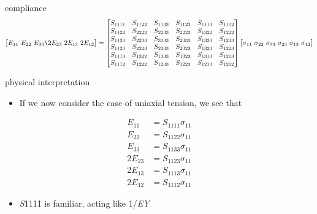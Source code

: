 \documentclass[
  letterpaper,
  ignorenonframetext,
  aspectratio=43,
  handout,
  12pt]{beamer}
\providecommand{\tightlist}{%
  \setlength{\itemsep}{0pt}\setlength{\parskip}{0pt}}
\providecommand{\tightlist}{%
\setlength{\itemsep}{0pt}\setlength{\parskip}{0pt}}
\begin{document}
\begin{frame}{compliance}
\protect\hypertarget{compliance}{}
\[\begin{bmatrix}
  E_{11} \ E_{22} \ E_{33} \2E_{23} \ 2E_{13} \ 2E_{12}
  \end{bmatrix}
  = \begin{bmatrix}
  S_{1111} & S_{1122} & S_{1133} & S_{1123} & S_{1113} & S_{1112} \\
  S_{1122} & S_{2222} & S_{2233} & S_{2223} & S_{1322} & S_{1222} \\
  S_{1133} & S_{2233} & S_{3333} & S_{2333} & S_{1333} & S_{1233} \\
  S_{1123} & S_{2223} & S_{2333} & S_{2323} & S_{1323} & S_{1223} \\
  S_{1113} & S_{1322} & S_{1333} & S_{1323} & S_{1313} & S_{1213} \\
  S_{1112} & S_{1222} & S_{1233} & S_{1223} & S_{1213} & S_{1212}
  \end{bmatrix}\begin{bmatrix}
  \sigma_{11} \ \sigma_{22} \ \sigma_{33} \ \sigma_{23} \ \sigma_{13} \ \sigma_{12}
\end{bmatrix}\]
\end{frame}

\begin{frame}{physical interpretation}
\protect\hypertarget{physical-interpretation}{}
\begin{itemize}
\tightlist
\item
  If we now consider the case of uniaxial tension, we see that
\end{itemize}

\[\begin{aligned}
  E_{11} &= S_{1111} \sigma_{11}\\
  E_{22} &= S_{1122} \sigma_{11}\\
  E_{33} &= S_{1133} \sigma_{11}\\
  2E_{23} &= S_{1123} \sigma_{11}\\
  2E_{13} &= S_{1113} \sigma_{11}\\
  2E_{12} &= S_{1112} \sigma_{11}
\end{aligned}\]

\begin{itemize}
\tightlist
\item
  \emph{S}1111 is familiar, acting like 1/\emph{E}\emph{Y}
\end{itemize}
\end{frame}
\end{document}
